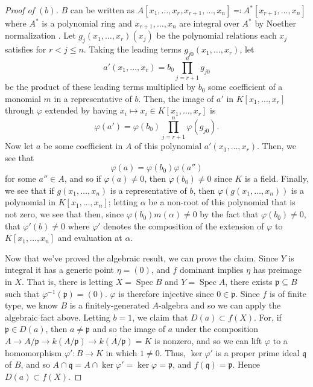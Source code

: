 \documentclass[10pt]{article}
\theoremstyle{definition}
\theoremstyle{remark}
\numberwithin{equation}{section}
\numberwithin{figure}{subsubsection}
\DeclareMathOperator{\Spec}{Spec}
\begin{document}
\begin{proof}[Proof of $(b)$]
  $B$ can be written as $A[x_1,\ldots,x_r,x_{r+1},\ldots,x_n] \eqqcolon A^*[x_{r+1},\ldots,x_n]$ where $A^*$ is a polynomial ring and $x_{r+1},\ldots,x_n$ are integral over $A^*$ by Noether normalization \cite[14.G]{Mat70}. Let $g_j(x_1,\ldots,x_r)(x_j)$ be the polynomial relations each $x_j$ satisfies for $r < j \le n$. Taking the leading terms $g_{j0}(x_1,\ldots,x_r)$, let
  \begin{equation*}
    a'(x_1,\ldots,x_r) = b_0\prod_{j=r+1}^n g_{j0}
  \end{equation*}
  be the product of these leading terms multiplied by $b_0$ some coefficient of a monomial $m$ in a representative of $b$. Then, the image of $a'$ in $K[x_1,\ldots,x_r]$ through $\varphi$ extended by having $x_i \mapsto x_i \in K[x_1,\ldots,x_r]$ is
  \begin{equation*}
    \varphi(a') = \varphi(b_0)\prod_{j=r+1}^n \varphi(g_{j0}).
  \end{equation*}
  Now let $a$ be some coefficient in $A$ of this polynomial $a'(x_1,\ldots,x_r)$. Then, we see that
  \begin{equation*}
    \varphi(a) = \varphi(b_0)\varphi(a'')
  \end{equation*}
  for some $a'' \in A$, and so if $\varphi(a) \ne 0$, then $\varphi(b_0) \ne 0$ since $K$ is a field. Finally, we see that if $g(x_1,\ldots,x_n)$ is a representative of $b$, then $\varphi(g(x_1,\ldots,x_n))$ is a polynomial in $K[x_1,\ldots,x_n]$; letting $\alpha$ be a non-root of this polynomial that is not zero, we see that then, since $\varphi(b_0)m(\alpha) \ne 0$ by the fact that $\varphi(b_0) \ne 0$, that $\varphi'(b) \ne 0$ where $\varphi'$ denotes the composition of the extension of $\varphi$ to $K[x_1,\ldots,x_n]$ and evaluation at $\alpha$.
  \par Now that we've proved the algebraic result, we can prove the claim. Since $Y$ is integral it has a generic point $\eta = (0)$, and $f$ dominant implies $\eta$ has preimage in $X$. That is, there is letting $X = \Spec B$ and $Y = \Spec A$, there exists $\mathfrak{p} \subseteq B$ such that $\varphi^{-1}(\mathfrak{p}) = (0)$. $\varphi$ is therefore injective since $0 \in \mathfrak{p}$. Since $f$ is of finite type, we know $B$ is a finitely-generated $A$-algebra and so we can apply the algebraic fact above. Letting $b=1$, we claim that $D(a) \subset f(X)$. For, if $\mathfrak{p} \in D(a)$, then $a \ne \mathfrak{p}$ and so the image of $a$ under the composition $A \to A/\mathfrak{p} \to k(A/\mathfrak{p}) \to \overline{k(A/\mathfrak{p})} = K$ is nonzero, and so we can lift $\varphi$ to a homomorphism $\varphi'\colon B \to K$ in which $1 \ne 0$. Thus, $\ker\varphi'$ is a proper prime ideal $\mathfrak{q}$ of $B$, and so $A \cap \mathfrak{q}  =A \cap \ker\varphi' = \ker\varphi = \mathfrak{p}$, and $f(\mathfrak{q}) = \mathfrak{p}$. Hence $D(a) \subset f(X)$.
\end{proof}
\end{document}
